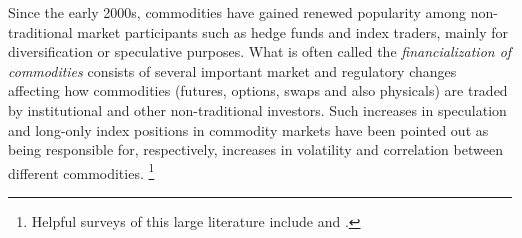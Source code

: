 \documentclass[12pt]{article}
\begin{document}


Since the early 2000s, commodities have gained renewed popularity among non-traditional market participants such as hedge funds and index traders, mainly for diversification or speculative purposes. What is often called the \emph{financialization of commodities} consists of several important market and regulatory changes affecting how commodities (futures, options, swaps and also physicals) are traded by institutional and other non-traditional investors. Such increases in speculation and long-only index positions in commodity markets have been pointed out as being responsible for, respectively, increases in volatility and correlation between different commodities. \footnote{Helpful surveys of this large literature include \citet{boyd2018update} and \citet{cheng2014financialization}.}
\end{document}
